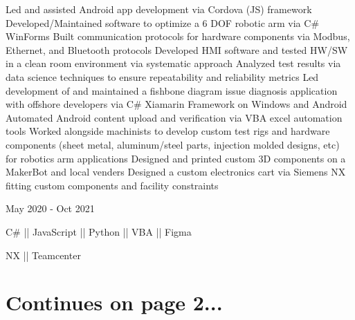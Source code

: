\vspace{-2.5ex}
\begin{detail}
    \BulletItem
    Led and assisted Android app development via Cordova (JS) framework
    \BulletItem
    Developed/Maintained software to optimize a 6 DOF robotic arm via C\# WinForms
    \BulletItem
    Built communication protocols for hardware components via Modbus, Ethernet, and Bluetooth protocols
    \BulletItem
    Developed HMI software and tested HW/SW in a clean room environment via systematic approach
    \BulletItem
    Analyzed test results via data science techniques to ensure repeatability and reliability metrics
    \BulletItem
    Led development of and maintained a fishbone diagram issue diagnosis application with offshore developers via C\# Xiamarin Framework on Windows and Android
    \BulletItem
    Automated Android content upload and verification via VBA excel automation tools
    \BulletItem
    Worked alongside machinists to develop custom test rigs and hardware components (sheet metal, aluminum/steel parts, injection molded designs, etc) for robotics arm applications
    \BulletItem
    Designed and printed custom 3D components on a MakerBot and local venders
    \BulletItem
    Designed a custom electronics cart via Siemens NX fitting custom components and facility constraints
    
\end{detail}

\begin{subtitle}
    \vspace{-34.8ex}
    {{May 2020 - Oct 2021}} 
\end{subtitle}

{ \vspace{24ex} \color{cyan}\small
{C\# || JavaScript || Python || VBA || Figma} }

{
\vspace{-2.5ex}\hspace{3.17in} \color{cyan} \small
{NX || Teamcenter} }
\vspace{1ex}


\vspace{0ex}
\section{Continues on page 2...}{}

